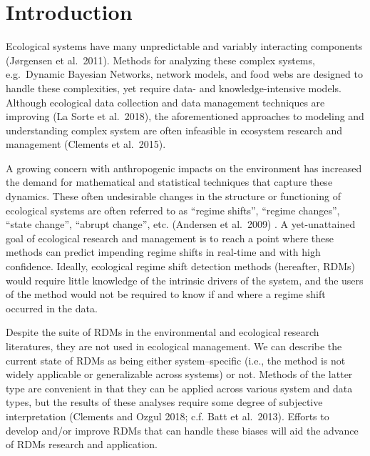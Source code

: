 \documentclass[12pt,twoside,openany]{reedthesis}
\begin{document}
\hypertarget{introduction-3}{%
\section{Introduction}\label{introduction-3}}

Ecological systems have many unpredictable and variably interacting components (Jørgensen et al.~2011). Methods for analyzing these complex systems, e.g.~Dynamic Bayesian Networks, network models, and food webs are designed to handle these complexities, yet require data- and knowledge-intensive models. Although ecological data collection and data management techniques are improving (La Sorte et al.~2018), the aforementioned approaches to modeling and understanding complex system are often infeasible in ecosystem research and management (Clements et al.~2015).

A growing concern with anthropogenic impacts on the environment has increased the demand for mathematical and statistical techniques that capture these dynamics. These often undesirable changes in the structure or functioning of ecological systems are often referred to as ``regime shifts'', ``regime changes'', ``state change'', ``abrupt change'', etc. (Andersen et al.~2009) . A yet-unattained goal of ecological research and management is to reach a point where these methods can predict impending regime shifts in real-time and with high confidence. Ideally, ecological regime shift detection methods (hereafter, RDMs) would require little knowledge of the intrinsic drivers of the system, and the users of the method would not be required to know if and where a regime shift occurred in the data.

Despite the suite of RDMs in the environmental and ecological research literatures, they are not used in ecological management. We can describe the current state of RDMs as being either system--specific (i.e., the method is not widely applicable or generalizable across systems) or not. Methods of the latter type are convenient in that they can be applied across various system and data types, but the results of these analyses require some degree of subjective interpretation (Clements and Ozgul 2018; c.f. Batt et al.~2013). Efforts to develop and/or improve RDMs that can handle these biases will aid the advance of RDMs research and application.
\end{document}
